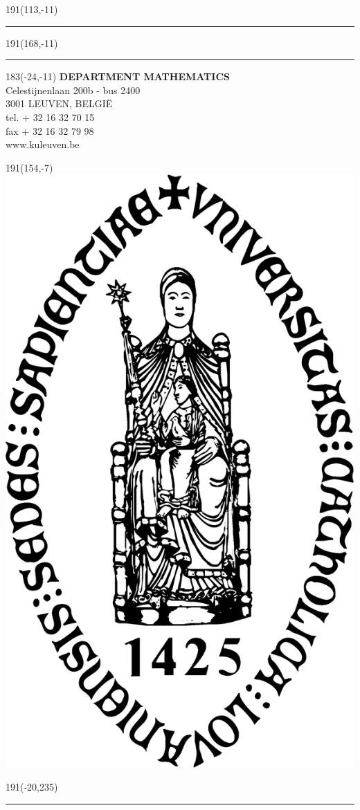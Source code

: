 \documentclass[12pt,a4paper,oneside]{book}
\begin{document}
%



\newpage
\thispagestyle{empty}
\sffamily
%
\begin{textblock}{191}(113,-11)
{\color{blueline}\rule{160pt}{5.5pt}}
\end{textblock}
%
\begin{textblock}{191}(168,-11)
{\color{blueline}\rule{5.5pt}{59pt}}
\end{textblock}
%
\begin{textblock}{183}(-24,-11)
\textblockcolour{}
\flushright
\fontsize{7}{7.5}\selectfont
\textbf{DEPARTMENT MATHEMATICS}\\
Celestijnenlaan 200b - bus 2400\\
3001 LEUVEN, BELGI\"{E}\\
tel. + 32 16 32 70 15 \\
fax + 32 16 32 79 98\\
www.kuleuven.be\\
\end{textblock}
%
\begin{textblock}{191}(154,-7)
\textblockcolour{}
\includegraphics*[height=16.5truemm]{sedes}
\end{textblock}
%
\begin{textblock}{191}(-20,235)
{\color{bluetitle}\rule{544pt}{55pt}}
\end{textblock}
\end{document}

